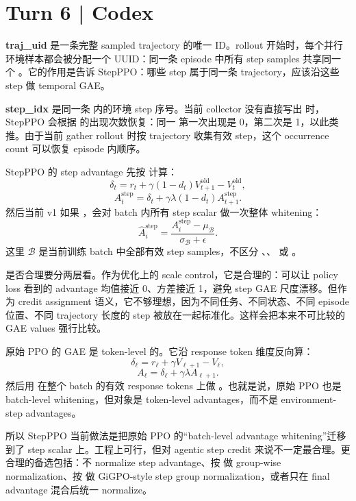 \documentclass[10pt]{ctexart}
\begin{document}
\section*{Turn 6 | Codex}
\textbf{traj\_uid} 是一条完整 sampled trajectory 的唯一 ID。rollout 开始时，每个并行环境样本都会被分配一个 UUID：同一条 episode 中所有 step samples 共享同一个 。它的作用是告诉 StepPPO：哪些 step 属于同一条 trajectory，应该沿这些 step 做 temporal GAE。

\textbf{step\_idx} 是同一条  内的环境 step 序号。当前 collector 没有直接写出  时，StepPPO 会根据  的出现次数恢复：同一  第一次出现是 0，第二次是 1，以此类推。由于当前 gather rollout 时按 trajectory 收集有效 step，这个 occurrence count 可以恢复 episode 内顺序。

StepPPO 的 step advantage 先按  计算：
\[
\delta_t=r_t+\gamma(1-d_t)V^{\mathrm{old}}_{t+1}-V^{\mathrm{old}}_t,
\]
\[
A_t^{\mathrm{step}}=\delta_t+\gamma\lambda(1-d_t)A_{t+1}^{\mathrm{step}}.
\]
然后当前 v1 如果 ，会对 batch 内所有 step scalar 做一次整体 whitening：
\[
\widehat A_i^{\mathrm{step}}
=
\frac{A_i^{\mathrm{step}}-\mu_{\mathcal B}}{\sigma_{\mathcal B}+\epsilon}.
\]
这里 $\mathcal B$ 是当前训练 batch 中全部有效 step samples，不区分 、、 或 。

是否合理要分两层看。作为优化上的 scale control，它是合理的：可以让 policy loss 看到的 advantage 均值接近 0、方差接近 1，避免 step GAE 尺度漂移。但作为 credit assignment 语义，它不够理想，因为不同任务、不同状态、不同 episode 位置、不同 trajectory 长度的 step 被放在一起标准化。这样会把本来不可比较的 GAE values 强行比较。

原始 PPO 的 GAE 是 token-level 的。它沿 response token 维度反向算：
\[
\delta_\ell=r_\ell+\gamma V_{\ell+1}-V_\ell,
\]
\[
A_\ell=\delta_\ell+\gamma\lambda A_{\ell+1}.
\]
然后用  在整个 batch 的有效 response tokens 上做 。也就是说，原始 PPO 也是 batch-level whitening，但对象是 token-level advantages，而不是 environment-step advantages。

所以 StepPPO 当前做法是把原始 PPO 的“batch-level advantage whitening”迁移到了 step scalar 上。工程上可行，但对 agentic step credit 来说不一定最合理。更合理的备选包括：不 normalize step advantage、按  做 group-wise normalization、按  做 GiGPO-style step group normalization，或者只在 final advantage 混合后统一 normalize。
\end{document}
